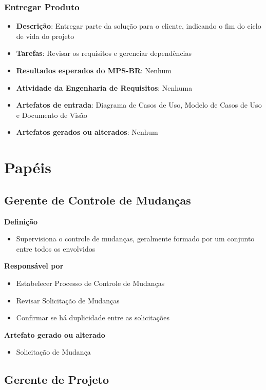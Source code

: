 \subsubsection{Entregar Produto}

\begin{itemize}
\item \textbf{Descrição}: Entregar parte da solução para o cliente, indicando o fim do ciclo de vida do projeto
\item \textbf{Tarefas}: Revisar os requisitos e gerenciar dependências
\item \textbf{Resultados esperados do MPS-BR}: Nenhum
\item \textbf{Atividade da Engenharia de Requisitos}: Nenhuma
\item \textbf{Artefatos de entrada}: Diagrama de Casos de Uso, Modelo de Casos de Uso e Documento de Visão
\item \textbf{Artefatos gerados ou alterados}: Nenhum
\end{itemize}

\section{Papéis}

\subsection{Gerente de Controle de Mudanças}

\textbf{Definição}
\begin{itemize}
\item Supervisiona o controle de mudanças, geralmente formado por um conjunto entre todos os envolvidos
\end{itemize}

\textbf{Responsável por}
\begin{itemize}
\item Estabelecer Processo de Controle de Mudanças
\item Revisar Solicitação de Mudanças
\item Confirmar se há duplicidade entre as solicitações
\end{itemize}

\textbf{Artefato gerado ou alterado}
\begin{itemize}
\item Solicitação de Mudança
\end{itemize}

\subsection{Gerente de Projeto}


